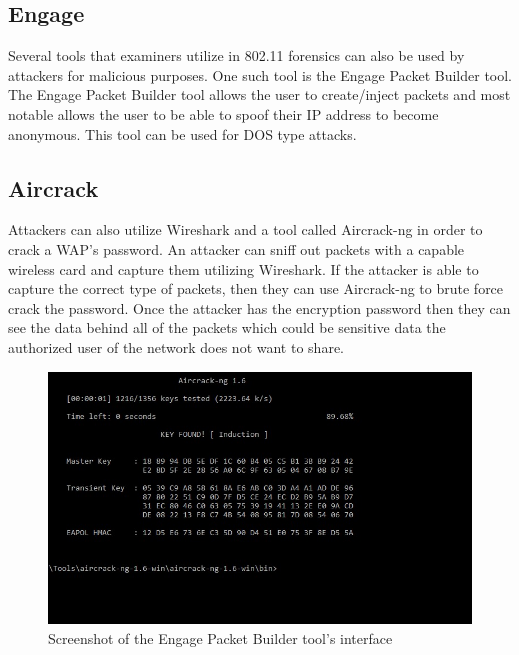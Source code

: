 \documentclass[acmlarge]{style/acmart}
\begin{document}

\subsection{Engage}

Several tools that examiners utilize in 802.11 forensics can also be used by attackers for malicious purposes. One such tool is the Engage Packet Builder tool. The Engage Packet Builder tool allows the user to create/inject packets and most notable allows the user to be able to spoof their IP address to become anonymous. This tool can be used for DOS type attacks. 


\subsection{Aircrack}

Attackers can also utilize Wireshark and a tool called Aircrack-ng in order to crack a WAP’s password. An attacker can sniff out packets with a capable wireless card and capture them utilizing Wireshark. If the attacker is able to capture the correct type of packets, then they can use Aircrack-ng to brute force crack the password. Once the attacker has the encryption password then they can see the data behind all of the packets which could be sensitive data the authorized user of the network does not want to share. 

\begin{figure}[H]
  \centering
  \includegraphics[width=0.5\linewidth]{imgs/aircrack.jpg}
  \caption{Screenshot of the Engage Packet Builder tool's interface}
  \label{fig:aircrack}
\end{figure}
\end{document}
